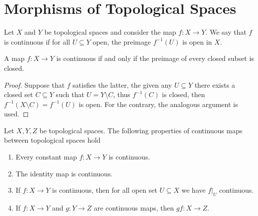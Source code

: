 \section{Morphisms of Topological Spaces}

\begin{definition}\label{def: continuous map}
    Let \(X\) and \(Y\) be topological spaces and consider the map \(f : X \to Y\). We
    say that \(f\) is continuous if for all \(U \subseteq Y\) open, the preimage
    \(f^{-1}(U)\) is open in \(X\).
\end{definition}

\begin{proposition}
    A map \(f : X \to Y\) is continuous if and only if the preimage of every closed
    subset is closed.
\end{proposition}

\begin{proof}
    Suppose that \(f\) satisfies the latter, the given any \(U \subseteq Y\) there
    exists a closed set \(C \subseteq Y\) such that \(U = Y \setminus C\), thus
    \(f^{-1}(C)\) is closed, then \(f^{-1}(X \setminus C) = f^{-1}(U)\) is open. For
    the contrary, the analogous argument is used.
\end{proof}

\begin{proposition}\label{prop: continuous maps properties}
    Let \(X, Y, Z\) be topological spaces. The following properties of continuous
    maps between topological spaces hold
    \begin{enumerate}[(CM1)]
        \item Every constant map \(f: X \to Y\) is continuous.
        \item The identity map is continuous.
        \item If \(f: X \to Y\) is continuous, then for all open set \(U \subseteq X\)
              we have \(f|_U\) continuous.
        \item If \(f: X \to Y\) and \(g: Y \to Z\) are continuous maps, then \(g f : X
              \to Z\).
    \end{enumerate}
\end{proposition}


